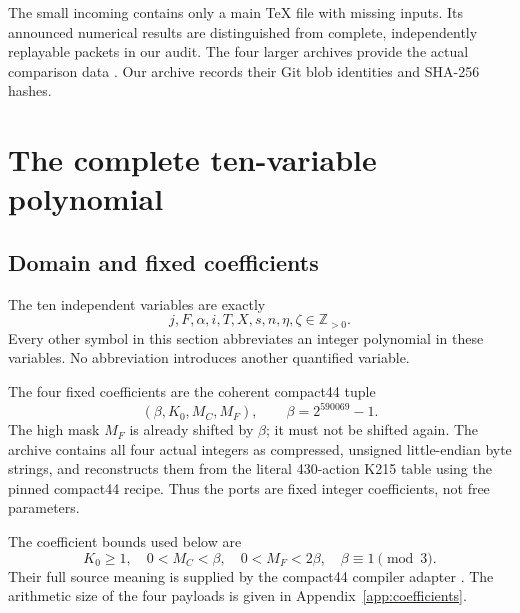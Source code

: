 \documentclass[11pt]{article}
\theoremstyle{remark}
\newcommand{\Zp}{\mathbb Z_{>0}}
\newcommand{\file}[1]{\path{#1}}
\begin{document}
The small incoming \file{report.zip} contains only a main TeX file with
missing inputs. Its announced numerical results are distinguished from
complete, independently replayable packets in our audit. The four larger
archives provide the actual comparison data \cite{joint,structural,radical,budget}.
Our archive records their Git blob identities and SHA-256 hashes.

\section{The complete ten-variable polynomial}\label{sec:equation}

\subsection{Domain and fixed coefficients}
The ten independent variables are exactly
\begin{equation}\label{eq:variables}
 j,F,\alpha,i,T,X,s,n,\eta,\zeta\in\Zp.
\end{equation}
Every other symbol in this section abbreviates an integer polynomial in
these variables. No abbreviation introduces another quantified variable.

The four fixed coefficients are the coherent compact44 tuple
\[
 (\beta,K_0,M_C,M_F),\qquad \beta=2^{590069}-1.
\]
The high mask $M_F$ is already shifted by $\beta$; it must not be shifted
again. The archive contains all four actual integers as compressed,
unsigned little-endian byte strings, and reconstructs them from the
literal 430-action K215 table using the pinned compact44 recipe. Thus the
ports are fixed integer coefficients, not free parameters.

The coefficient bounds used below are
\begin{equation}\label{eq:maskbounds}
 K_0\ge1,\quad 0<M_C<\beta,\quad 0<M_F<2\beta,
 \quad \beta\equiv1\pmod3.
\end{equation}
Their full source meaning is supplied by the compact44 compiler adapter
\cite{compact44}. The arithmetic size of the four payloads is given in
Appendix~\ref{app:coefficients}.
\end{document}
